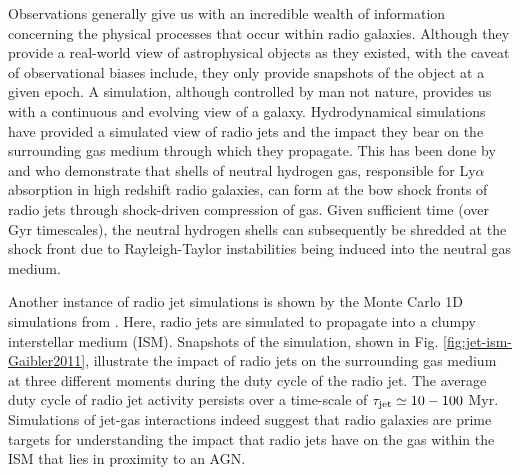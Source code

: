 \documentclass[10pt,a4paper]{article}
\begin{document}
Observations generally give us with an incredible wealth of information concerning the physical processes that occur within radio galaxies. Although they provide a real-world view of astrophysical objects as they existed, with the caveat of observational biases include, they only provide snapshots of the object at a given epoch. A simulation, although controlled by man not nature, provides us with a continuous and evolving view of a galaxy. Hydrodynamical simulations have provided a simulated view of radio jets and the impact they bear on the surrounding gas medium through which they propagate. This has been done by \citet{krause2002} and \citet{krause2005} who demonstrate that shells of neutral hydrogen gas, responsible for Ly$\alpha$ absorption in high redshift radio galaxies, can form at the bow shock fronts of radio jets through shock-driven compression of gas. Given sufficient time (over Gyr timescales), the neutral hydrogen shells can subsequently be shredded at the shock front due to Rayleigh-Taylor instabilities being induced into the neutral gas medium. 

Another instance of radio jet simulations is shown by the Monte Carlo 1D simulations from \citet{Gaibler2011}. Here, radio jets are simulated to propagate into a clumpy interstellar medium (ISM). Snapshots of the simulation, shown in Fig. \ref{fig:jet-ism-Gaibler2011}, illustrate the impact of radio jets on the surrounding gas medium at three different moments during the duty cycle of the radio jet. The average duty cycle of radio jet activity persists over a time-scale of $\tau_{\rm jet} \simeq 10 - 100$ Myr. Simulations of jet-gas interactions indeed suggest that radio galaxies are prime targets for understanding the impact that radio jets have on the gas within the ISM that lies in proximity to an AGN.
\end{document}
